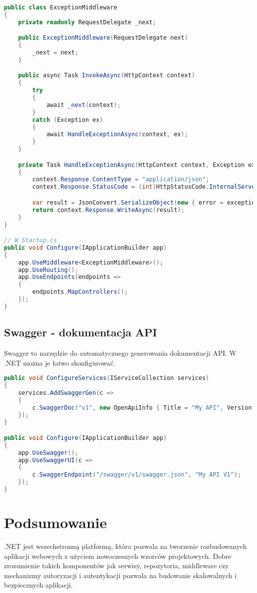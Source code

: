 \documentclass[a4paper,12pt]{article}
\begin{document}
\begin{lstlisting}[language=C#, caption=Przykład globalnej obsługi wyjątków]
public class ExceptionMiddleware
{
    private readonly RequestDelegate _next;

    public ExceptionMiddleware(RequestDelegate next)
    {
        _next = next;
    }

    public async Task InvokeAsync(HttpContext context)
    {
        try
        {
            await _next(context);
        }
        catch (Exception ex)
        {
            await HandleExceptionAsync(context, ex);
        }
    }

    private Task HandleExceptionAsync(HttpContext context, Exception exception)
    {
        context.Response.ContentType = "application/json";
        context.Response.StatusCode = (int)HttpStatusCode.InternalServerError;

        var result = JsonConvert.SerializeObject(new { error = exception.Message });
        return context.Response.WriteAsync(result);
    }
}

// W Startup.cs
public void Configure(IApplicationBuilder app)
{
    app.UseMiddleware<ExceptionMiddleware>();
    app.UseRouting();
    app.UseEndpoints(endpoints =>
    {
        endpoints.MapControllers();
    });
}
\end{lstlisting}

\subsection{Swagger - dokumentacja API}
Swagger to narzędzie do automatycznego generowania dokumentacji API. W .NET można je łatwo skonfigurować.

\begin{lstlisting}[language=C#, caption=Konfiguracja Swagger w Startup.cs]
public void ConfigureServices(IServiceCollection services)
{
    services.AddSwaggerGen(c =>
    {
        c.SwaggerDoc("v1", new OpenApiInfo { Title = "My API", Version = "v1" });
    });
}

public void Configure(IApplicationBuilder app)
{
    app.UseSwagger();
    app.UseSwaggerUI(c =>
    {
        c.SwaggerEndpoint("/swagger/v1/swagger.json", "My API V1");
    });
}
\end{lstlisting}

\section{Podsumowanie}
.NET jest wszechstronną platformą, która pozwala na tworzenie rozbudowanych aplikacji webowych z użyciem nowoczesnych wzorców projektowych. Dobre zrozumienie takich komponentów jak serwisy, repozytoria, middleware czy mechanizmy autoryzacji i autentykacji pozwala na budowanie skalowalnych i bezpiecznych aplikacji.
\end{document}
